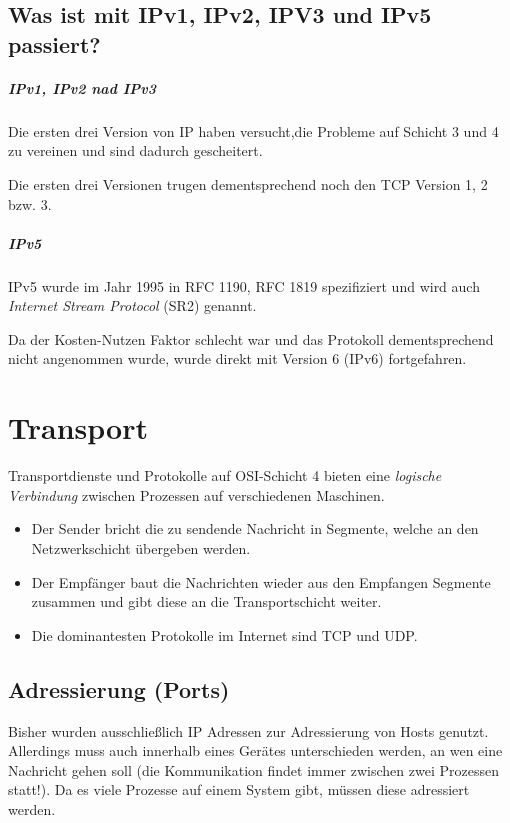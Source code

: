	\section{Was ist mit IPv1, IPv2, IPV3 und IPv5 passiert?}
		\paragraph{IPv1, IPv2 nad IPv3}
			Die ersten drei Version von IP haben versucht,die Probleme auf Schicht 3 und 4 zu vereinen und sind dadurch gescheitert.

			Die ersten drei Versionen trugen dementsprechend noch den TCP Version 1, 2 bzw. 3.

		\paragraph{IPv5}
			IPv5 wurde im Jahr 1995 in RFC 1190, RFC 1819 spezifiziert und wird auch \textit{Internet Stream Protocol} (SR2) genannt.

			Da der Kosten-Nutzen Faktor schlecht war und das Protokoll dementsprechend nicht angenommen wurde, wurde direkt mit Version 6 (IPv6) fortgefahren.

\chapter{Transport}
	Transportdienste und Protokolle auf OSI-Schicht 4 bieten eine \textit{logische Verbindung} zwischen Prozessen auf verschiedenen Maschinen.
	\begin{itemize}
		\item Der Sender bricht die zu sendende Nachricht in Segmente, welche an den Netzwerkschicht übergeben werden.
		\item Der Empfänger baut die Nachrichten wieder aus den Empfangen Segmente zusammen und gibt diese an die Transportschicht weiter.
		\item Die dominantesten Protokolle im Internet sind TCP und UDP.
	\end{itemize}

	\section{Adressierung (Ports)}
		Bisher wurden ausschließlich IP Adressen zur Adressierung von Hosts genutzt. Allerdings muss auch innerhalb eines Gerätes unterschieden werden, an wen eine Nachricht gehen soll (die Kommunikation findet immer zwischen zwei Prozessen statt!). Da es viele Prozesse auf einem System gibt, müssen diese adressiert werden.

